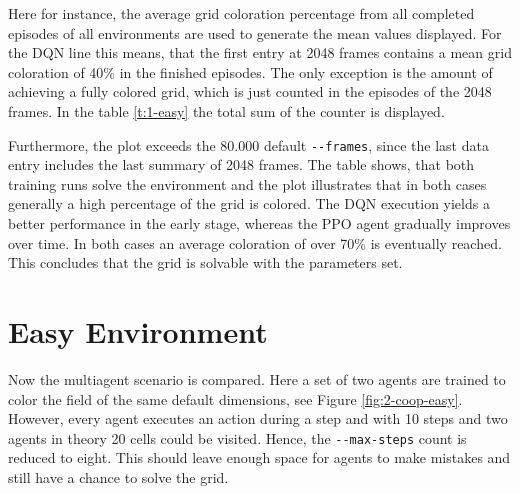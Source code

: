 Here for instance, the average grid coloration percentage from all completed episodes of all environments are used to generate the mean values displayed. For the DQN line this means, that the first entry at 2048 frames contains a mean grid coloration of 40\% in the finished episodes. The only exception is the amount of achieving a fully colored grid, which is just counted in the episodes of the 2048 frames. 
In the table \ref{t:1-easy} the total sum of the counter is displayed.


Furthermore, the plot exceeds the 80.000 default \verb|--frames|, since the last data entry includes the last summary of 2048 frames. The table shows, that both training runs solve the environment and the plot illustrates that in both cases generally a high percentage of the grid is colored. The DQN execution yields a better performance in the early stage, whereas the PPO agent gradually improves over time. In both cases an average coloration of over 70\% is eventually reached. This concludes that the grid is solvable with the parameters set.

\section{Easy Environment} \label{easy_env}

Now the multiagent scenario is compared. Here a set of two agents are trained to color the field of the same default dimensions, see Figure \ref{fig:2-coop-easy}. However, every agent executes an action during a step and with 10 steps and two agents in theory 20 cells could be visited. Hence, the \verb|--max-steps| count is reduced to eight. This should leave enough space for agents to make mistakes and still have a chance to solve the grid.

